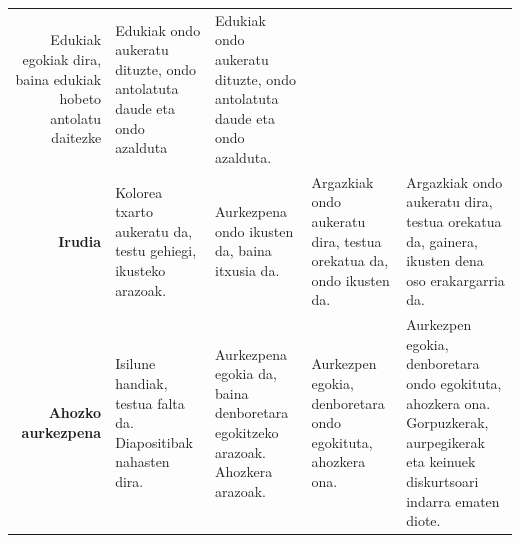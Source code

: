 \documentclass[]{book}
\begin{document}
\begin{longtable}[]{@{}rllll@{}}
\begin{minipage}[t]{0.19\columnwidth}
Edukiak egokiak dira, baina edukiak hobeto antolatu daitezke\strut
\end{minipage} & \begin{minipage}[t]{0.19\columnwidth}\raggedright
Edukiak ondo aukeratu dituzte, ondo antolatuta daude eta ondo azalduta\strut
\end{minipage} & \begin{minipage}[t]{0.19\columnwidth}\raggedright
Edukiak ondo aukeratu dituzte, ondo antolatuta daude eta ondo azalduta.\strut
\end{minipage}\tabularnewline
\begin{minipage}[t]{0.11\columnwidth}\raggedleft
\textbf{Irudia}\strut
\end{minipage} & \begin{minipage}[t]{0.19\columnwidth}\raggedright
Kolorea txarto aukeratu da, testu gehiegi, ikusteko arazoak.\strut
\end{minipage} & \begin{minipage}[t]{0.19\columnwidth}\raggedright
Aurkezpena ondo ikusten da, baina itxusia da.\strut
\end{minipage} & \begin{minipage}[t]{0.19\columnwidth}\raggedright
Argazkiak ondo aukeratu dira, testua orekatua da, ondo ikusten da.\strut
\end{minipage} & \begin{minipage}[t]{0.19\columnwidth}\raggedright
Argazkiak ondo aukeratu dira, testua orekatua da, gainera, ikusten dena oso erakargarria da.\strut
\end{minipage}\tabularnewline
\begin{minipage}[t]{0.11\columnwidth}\raggedleft
\textbf{Ahozko aurkezpena}\strut
\end{minipage} & \begin{minipage}[t]{0.19\columnwidth}\raggedright
Isilune handiak, testua falta da. Diapositibak nahasten dira.\strut
\end{minipage} & \begin{minipage}[t]{0.19\columnwidth}\raggedright
Aurkezpena egokia da, baina denboretara egokitzeko arazoak. Ahozkera arazoak.\strut
\end{minipage} & \begin{minipage}[t]{0.19\columnwidth}\raggedright
Aurkezpen egokia, denboretara ondo egokituta, ahozkera ona.\strut
\end{minipage} & \begin{minipage}[t]{0.19\columnwidth}\raggedright
Aurkezpen egokia, denboretara ondo egokituta, ahozkera ona. Gorpuzkerak, aurpegikerak eta keinuek diskurtsoari indarra ematen diote.\strut
\end{minipage}\tabularnewline
\bottomrule
\end{longtable}
\end{document}
